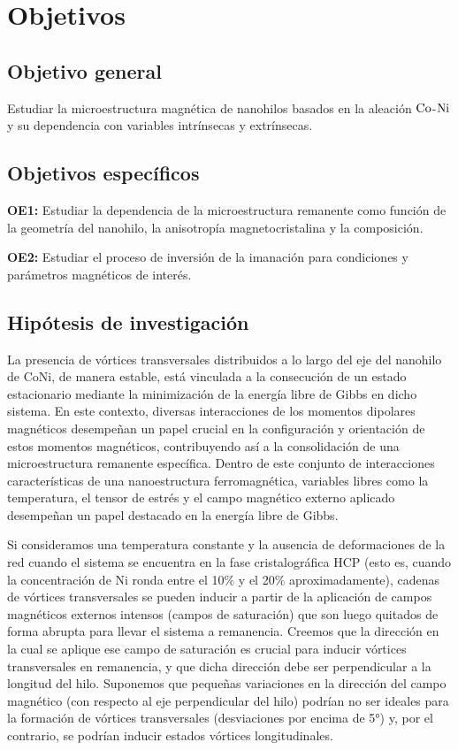 \newpage
\section{Objetivos}
\subsection{Objetivo general}
Estudiar la microestructura magnética de nanohilos basados en la aleación $\ce{Co}$-$\ce{Ni}$ y su dependencia con variables intrínsecas y extrínsecas.
\subsection{Objetivos específicos}
    \textbf{OE1:} Estudiar la dependencia de la microestructura remanente como función de la geometría del nanohilo, la anisotropía magnetocristalina y la composición.

    \vspace{10pt}

    \textbf{OE2:} Estudiar el proceso de inversión de la imanación para condiciones y parámetros magnéticos de interés.

\subsection{Hipótesis de investigación}
La presencia de vórtices transversales distribuidos a lo largo del eje del nanohilo de CoNi, de manera estable, está vinculada a la consecución de un estado estacionario mediante la minimización de la energía libre de Gibbs en dicho sistema. En este contexto, diversas interacciones de los momentos dipolares magnéticos desempeñan un papel crucial en la configuración y orientación de estos momentos magnéticos, contribuyendo así a la consolidación de una microestructura remanente específica. Dentro de este conjunto de interacciones características de una nanoestructura ferromagnética, variables libres como la temperatura, el tensor de estrés y el campo magnético externo aplicado desempeñan un papel destacado en la energía libre de Gibbs.

\vspace{10pt}

Si consideramos una temperatura constante y la ausencia de deformaciones de la red cuando el sistema se encuentra en la fase cristalográfica HCP (esto es, cuando la concentración de Ni ronda entre el 10$\%$ y el 20$\%$ aproximadamente), cadenas de vórtices transversales se pueden inducir a partir de la aplicación de campos magnéticos externos intensos (campos de saturación) que son luego quitados de forma abrupta para llevar el sistema a remanencia. Creemos que la dirección en la cual se aplique ese campo de saturación es crucial para inducir vórtices transversales en remanencia, y que dicha dirección debe ser perpendicular a la longitud del hilo. Suponemos que pequeñas variaciones en la dirección del campo magnético (con respecto al eje perpendicular del hilo) podrían no ser ideales para la formación de vórtices transversales (desviaciones por encima de 5°) y, por el contrario, se podrían inducir estados vórtices longitudinales. 